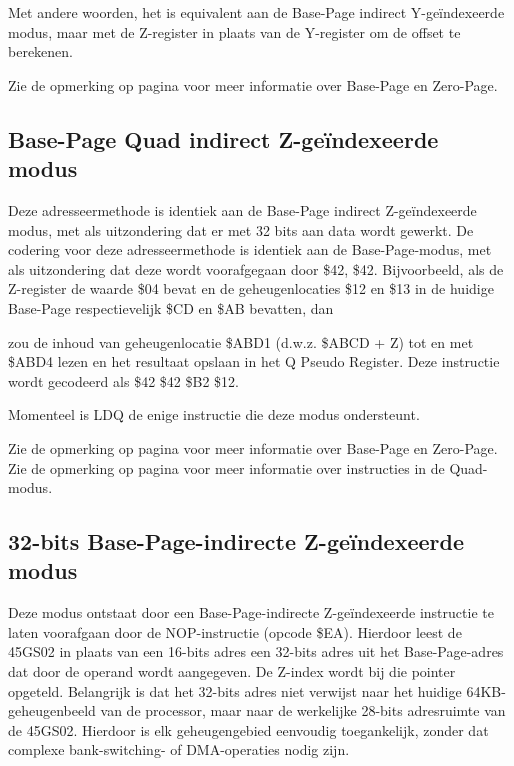 Met andere woorden, het is equivalent aan de Base-Page indirect Y-geïndexeerde modus, maar met de Z-register in plaats van de Y-register om de offset te berekenen.

Zie de opmerking op pagina \pageref{Base-Page (Zero-Page) Mode} voor meer informatie over Base-Page en Zero-Page.

\subsection{Base-Page Quad indirect Z-geïndexeerde modus}

Deze adresseermethode is identiek aan de Base-Page indirect Z-geïndexeerde modus, met als uitzondering dat er met 32 bits aan data wordt gewerkt. De codering voor deze adresseermethode is identiek aan de Base-Page-modus, met als uitzondering dat deze wordt voorafgegaan door \$42, \$42. Bijvoorbeeld, als de Z-register de waarde \$04 bevat en de geheugenlocaties \$12 en \$13 in de huidige Base-Page respectievelijk \$CD en \$AB bevatten, dan


zou de inhoud van geheugenlocatie \$ABD1 (d.w.z. \$ABCD + Z) tot en met \$ABD4 lezen en het resultaat opslaan in het Q Pseudo Register. Deze instructie wordt gecodeerd als \$42 \$42 \$B2 \$12.

Momenteel is LDQ de enige instructie die deze modus ondersteunt.

Zie de opmerking op pagina \pageref{Base-Page (Zero-Page) Mode} voor meer informatie over Base-Page en Zero-Page. Zie de opmerking op pagina \pageref{Base-Page (Zero-Page) Quad Mode} voor meer informatie over instructies in de Quad-modus.

\subsection{32-bits Base-Page-indirecte Z-geïndexeerde modus}
\label{32-bit Base-Page (Zero-Page) Indirect Z-Indexed Mode}

Deze modus ontstaat door een Base-Page-indirecte Z-geïndexeerde instructie te laten voorafgaan door de {NOP}-instructie (opcode \$EA). Hierdoor leest de 45GS02 in plaats van een 16-bits adres een 32-bits adres uit het Base-Page-adres dat door de operand wordt aangegeven. De Z-index wordt bij die pointer opgeteld. Belangrijk is dat het 32-bits adres niet verwijst naar het huidige 64KB-geheugenbeeld van de processor, maar naar de werkelijke 28-bits adresruimte van de 45GS02. Hierdoor is elk geheugengebied eenvoudig toegankelijk, zonder dat complexe bank-switching- of DMA-operaties nodig zijn.

